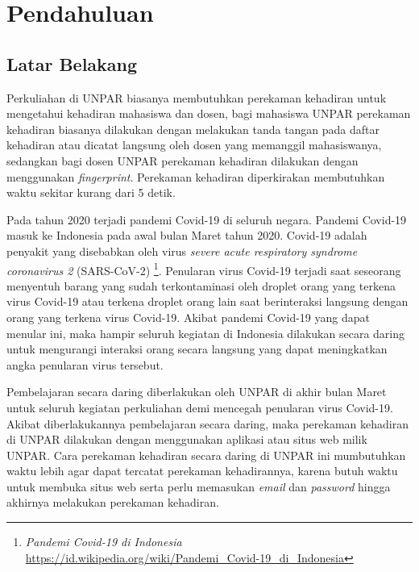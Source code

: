 \chapter{Pendahuluan}
\label{chap:intro}
   
\section{Latar Belakang}
\label{sec:label}
Perkuliahan di UNPAR biasanya membutuhkan perekaman kehadiran untuk mengetahui kehadiran mahasiswa dan dosen, bagi mahasiswa UNPAR perekaman kehadiran biasanya dilakukan dengan melakukan tanda tangan pada daftar kehadiran atau dicatat langsung oleh dosen yang memanggil mahasiswanya, sedangkan bagi dosen UNPAR perekaman kehadiran dilakukan dengan menggunakan  \textit{fingerprint}. Perekaman kehadiran diperkirakan membutuhkan waktu sekitar kurang dari 5 detik.

Pada tahun 2020 terjadi pandemi Covid-19 di seluruh negara. Pandemi Covid-19 masuk ke Indonesia pada awal bulan Maret tahun 2020. Covid-19 adalah penyakit yang disebabkan oleh virus \textit{severe acute respiratory syndrome coronavirus 2} (SARS-CoV-2) \footnote{\textit{Pandemi Covid-19 di Indonesia} \url{https://id.wikipedia.org/wiki/Pandemi_Covid-19_di_Indonesia}}. Penularan virus Covid-19 terjadi saat seseorang menyentuh barang yang sudah terkontaminasi oleh droplet orang yang terkena virus Covid-19 atau terkena droplet orang lain saat berinteraksi langsung dengan orang yang terkena virus Covid-19.  Akibat pandemi Covid-19 yang dapat menular ini, maka hampir seluruh kegiatan di Indonesia dilakukan secara daring untuk mengurangi interaksi orang secara langsung yang dapat meningkatkan angka penularan virus tersebut. 

Pembelajaran secara daring diberlakukan oleh UNPAR di akhir bulan Maret untuk seluruh kegiatan perkuliahan demi mencegah penularan virus Covid-19. Akibat diberlakukannya pembelajaran secara daring, maka perekaman kehadiran di UNPAR dilakukan dengan menggunakan aplikasi atau situs web milik UNPAR. Cara perekaman kehadiran secara daring di UNPAR ini mumbutuhkan waktu lebih agar dapat tercatat perekaman kehadirannya, karena butuh waktu untuk membuka situs web serta perlu memasukan \textit{email} dan \textit{password} hingga akhirnya melakukan perekaman kehadiran. 

